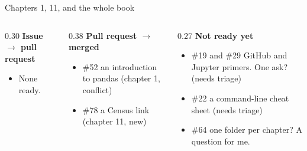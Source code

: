 \documentclass[9pt,aspectratio=169]{beamer}
\begin{document}
\begin{frame}{Chapters 1, 11, and the whole book}
    \begin{columns}[T]
        \begin{column}{0.30\textwidth}
            \textbf{Issue $\to$ pull request}
            \begin{itemize}\small
                \item None ready.
            \end{itemize}
        \end{column}
        \begin{column}{0.38\textwidth}
            \textbf{Pull request $\to$ merged}
            \begin{itemize}\small
                \item \#52 an introduction to pandas (chapter 1, conflict)
                \item \#78 a Census link (chapter 11, new)
            \end{itemize}
        \end{column}
        \begin{column}{0.27\textwidth}
            \textbf{Not ready yet}
            \begin{itemize}\small
                \item \#19 and \#29 GitHub and Jupyter primers. One ask? (needs triage)
                \item \#22 a command-line cheat sheet (needs triage)
                \item \#64 one folder per chapter? A question for me.
            \end{itemize}
        \end{column}
    \end{columns}
\end{frame}
\end{document}
